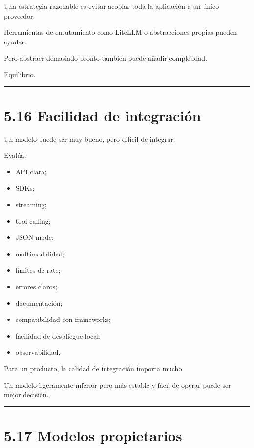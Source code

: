 Una estrategia razonable es evitar acoplar toda la aplicación a un único
proveedor.

Herramientas de enrutamiento como LiteLLM o abstracciones propias pueden
ayudar.

Pero abstraer demasiado pronto también puede añadir complejidad.

Equilibrio.

\begin{center}\rule{0.5\linewidth}{0.5pt}\end{center}

\section{5.16 Facilidad de
integración}\label{facilidad-de-integraciuxf3n}

Un modelo puede ser muy bueno, pero difícil de integrar.

Evalúa:

\begin{itemize}
\tightlist
\item
  API clara;
\item
  SDKs;
\item
  streaming;
\item
  tool calling;
\item
  JSON mode;
\item
  multimodalidad;
\item
  límites de rate;
\item
  errores claros;
\item
  documentación;
\item
  compatibilidad con frameworks;
\item
  facilidad de despliegue local;
\item
  observabilidad.
\end{itemize}

Para un producto, la calidad de integración importa mucho.

Un modelo ligeramente inferior pero más estable y fácil de operar puede
ser mejor decisión.

\begin{center}\rule{0.5\linewidth}{0.5pt}\end{center}

\section{5.17 Modelos propietarios}\label{modelos-propietarios}

